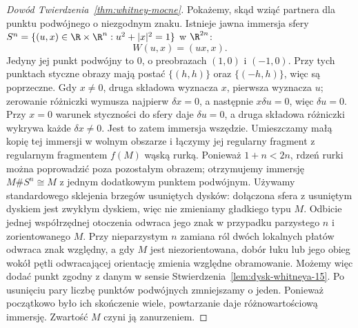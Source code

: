 \begin{proof}[Dowód Twierdzenia~\ref{thm:whitney-mocne}]
Pokażemy, skąd wziąć partnera dla
punktu podwójnego o niezgodnym znaku.
Istnieje jawna immersja sfery
$S^n=\{(u,x)\in\R\times\R^n:
u^2+|x|^2=1\}$ w $\R^{2n}$:
\[
 W(u,x)=(ux,x).
\]
Jedyny jej punkt podwójny to $0$,
o preobrazach $(1,0)$ i $(-1,0)$.
Przy tych punktach styczne obrazy
mają postać $\{(h,h)\}$ oraz
$\{(-h,h)\}$, więc są poprzeczne.
Gdy $x\ne0$, druga składowa
wyznacza $x$, pierwsza wyznacza $u$;
zerowanie różniczki wymusza najpierw $\delta x=0$,
a następnie $x\delta u=0$, więc $\delta u=0$.
Przy $x=0$ warunek styczności do sfery daje
$\delta u=0$, a druga składowa różniczki wykrywa
każde $\delta x\ne0$. Jest to zatem immersja wszędzie. Umieszczamy małą
kopię tej immersji w wolnym
obszarze i łączymy jej regularny
fragment z regularnym fragmentem
$f(M)$ wąską rurką. Ponieważ
$1+n<2n$, rdzeń rurki można
poprowadzić poza pozostałym
obrazem; otrzymujemy immersję
$M\#S^n\cong M$ z jednym
dodatkowym punktem podwójnym. Używamy standardowego
sklejenia brzegów usuniętych dysków: dołączona
sfera z usuniętym dyskiem jest zwykłym dyskiem,
więc nie zmieniamy gładkiego typu $M$.
Odbicie jednej współrzędnej
otoczenia odwraca jego znak
w przypadku parzystego
$n$ i zorientowanego $M$.
Przy nieparzystym $n$ zamiana
ról dwóch lokalnych płatów
odwraca znak względny,
a gdy $M$ jest niezorientowana,
dobór łuku lub jego obieg wokół
pętli odwracającej orientację
zmienia względne obramowanie.
Możemy więc dodać punkt
zgodny z danym w sensie
Stwierdzenia~\ref{lem:dysk-whitneya-15}.
Po usunięciu pary liczbę
punktów podwójnych zmniejszamy
o jeden. Ponieważ początkowo
było ich skończenie wiele,
powtarzanie daje różnowartościową
immersję. Zwartość $M$ czyni
ją zanurzeniem.


\end{proof}
